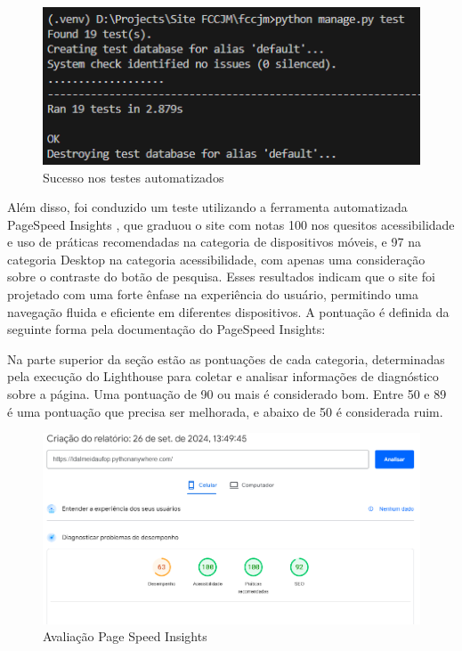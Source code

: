 \begin{figure}[htb] \caption{\label{fig_grafico}Sucesso nos testes automatizados } \begin{center} \includegraphics[scale=0.3]{./img/tests.png} \end{center}  \end{figure}

Além disso, foi conduzido um teste utilizando a ferramenta automatizada PageSpeed Insights \cite{PageSpeedInsights}, que graduou o site com notas 100 nos quesitos acessibilidade e uso de práticas recomendadas na categoria de dispositivos móveis, e 97 na categoria Desktop na categoria acessibilidade, com apenas uma consideração sobre o contraste do botão de pesquisa. Esses resultados indicam que o site foi projetado com uma forte ênfase na experiência do usuário, permitindo uma navegação fluida e eficiente em diferentes dispositivos. A pontuação é definida da seguinte forma pela documentação do PageSpeed Insights:

\begin{citacao}
    Na parte superior da seção estão as pontuações de cada categoria, determinadas pela execução do Lighthouse para coletar e analisar informações de diagnóstico sobre a página. Uma pontuação de 90 ou mais é considerado bom. Entre 50 e 89 é uma pontuação que precisa ser melhorada, e abaixo de 50 é considerada ruim. \cite{PageSpeedInsightsDocs}
\end{citacao}

\begin{figure}[htb] \caption{\label{fig_grafico}Avaliação Page Speed Insights} \begin{center} \includegraphics[scale=0.3]{./img/pagespeedinsights.png} \end{center}  \end{figure}

